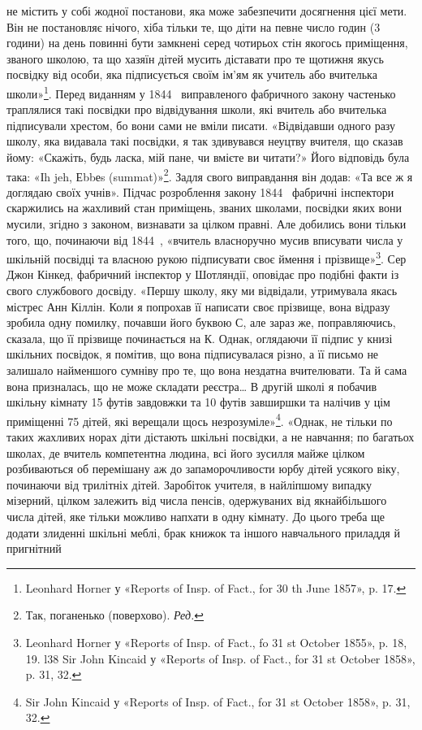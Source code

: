 \parcont{}  %
не містить у собі жодної постанови, яка може забезпечити досягнення
цієї мети. Він не постановляє нічого, хіба тільки те, що
діти на певне число годин (3 години) на день повинні бути замкнені
серед чотирьох стін якогось приміщення, званого школою, та
що хазяїн дітей мусить діставати про те щотижня якусь посвідку
від особи, яка підписується своїм ім’ям як учитель або вчителька
школи»\footnote{
Leonhard Horner у «Reports of Insp. of Fact., for 30 th June 1857»,
p. 17.
}. Перед виданням у 1844~ виправленого фабричного
закону частенько траплялися такі посвідки про відвідування
школи, які вчитель або вчителька підписували хрестом, бо вони
сами не вміли писати. «Відвідавши одного разу школу, яка видавала
такі посвідки, я так здивувався неуцтву вчителя, що сказав
йому: «Скажіть, будь ласка, мій пане, чи вмієте ви читати?»
Його відповідь була така: «Іh jeh, Еbbеs (summat)»\footnote*{
Так, поганенько (поверхово). \emph{Ред.}
}. Задля свого
виправдання він додав: «Та все ж я доглядаю своїх учнів». Підчас
розроблення закону 1844~ фабричні інспектори скаржились
на жахливий стан приміщень, званих школами, посвідки яких
вони мусили, згідно з законом, визнавати за цілком правні. Але
добились вони тільки того, що, починаючи від 1844~, «вчитель
власноручно мусив вписувати числа у шкільній посвідці та власною
рукою підписувати своє ймення і прізвище»\footnote{
Leonhard Horner у «Reports of Insp. of Fact., fo 31 st October
1855», p. 18, 19.
l38 Sir John Kincaid у «Reports of Insp. of Fact., for 31 st October
1858», p. 31, 32.
}. Сер Джон
Кінкед, фабричний інспектор у Шотляндії, оповідає про подібні
факти із свого службового досвіду. «Першу школу, яку ми відвідали,
утримувала якась містрес Анн Кіллін. Коли я попрохав її
написати своє прізвище, вона відразу зробила одну помилку,
почавши його буквою С, але зараз же, поправляючись, сказала,
що її прізвище починається на К. Однак, оглядаючи її підпис у
книзі шкільних посвідок, я помітив, що вона підписувалася різно,
а її письмо не залишало найменшого сумніву про те, що вона
нездатна вчителювати. Та й сама вона призналась, що не може
складати реєстра\dots{} В другій школі я побачив шкільну кімнату
15 футів завдовжки та 10 футів завширшки та налічив у цім приміщенні
75 дітей, які верещали щось незрозуміле»\footnote{Sir John Kincaid у
«Reports of Insp. of Fact., for 31 st October
1858», p. 31, 32.
}. «Однак,
не тільки по таких жахливих норах діти дістають шкільні посвідки,
а не навчання; по багатьох школах, де вчитель компетентна
людина, всі його зусилля майже цілком розбиваються об
перемішану аж до запаморочливости юрбу дітей усякого віку,
починаючи від трилітніх дітей. Заробіток учителя, в найліпшому
випадку мізерний, цілком залежить від числа пенсів, одержуваних
від якнайбільшого числа дітей, яке тільки можливо напхати в
одну кімнату. До цього треба ще додати злиденні шкільні меблі,
брак книжок та іншого навчального приладдя й пригнітний
\parbreak{}  %
